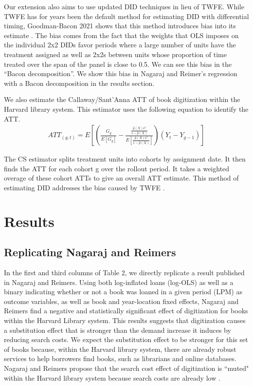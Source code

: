 \documentclass{article}
\begin{document}
Our extension also aims to use updated DID techniques in lieu of TWFE. While TWFE has for years been the default method for estimating DID with differential timing, Goodman-Bacon 2021 shows that this method introduces bias into its estimate \cite{goodman2021difference}. The bias comes from the fact that the weights that OLS imposes on the individual 2x2 DIDs favor periods where a large number of units have the treatment assigned as well as 2x2s between units whose proportion of time treated over the span of the panel is close to 0.5. We can see this bias in the ``Bacon decomposition”. We show this bias in Nagaraj and Reimer's regression with a Bacon decomposition  in the results section. 

We also estimate the Callaway/Sant'Anna ATT of book digitization within the Harvard library system. This estimator uses the following equation to identify the ATT. 
\begin{align*}
ATT_{(g,t)} = E\left[\left(\frac{G_g}{E\left[G_g\right]} - \frac{\frac{\hat{p}(X)C}{1-\hat{p}(X)}}{E\left[\frac{\hat{p}(X)C}{1-\hat{p}(X)}\right]}\right) \left(Y_t-Y_{g-1}\right)\right]
\end{align*}

The CS estimator splits treatment units into cohorts by assignment date. It then finds the ATT for each cohort g over the rollout period. It takes a weighted overage of these cohort ATTs to give an overall ATT estimate. This method of estimating DID addresses the bias caused by TWFE \cite{callaway2021difference}.


\section{Results}
\subsection{Replicating Nagaraj and Reimers}

In the first and third columns of Table 2, we directly replicate a result published in Nagaraj and Reimers. Using both log-inflated loans (log-OLS) as well as a binary indicating whether or not a book was loaned in a given period (LPM) as outcome variables, as well as book and year-location fixed effects, Nagaraj and Reimers find a negative and statistically significant effect of digitization for books within the Harvard Library system. This results suggests that digitization causes a substitution effect that is stronger than the demand increase it induces by reducing search costs. We expect the substitution effect to be stronger for this set of books because, within the Harvard library system, there are already robust services to help borrowers find books, such as librarians and online databases. Nagaraj and Reimers propose that the search cost effect of digitization is ``muted" within the Harvard library system because search costs are already low \cite{nagaraj2021digitization}. 
\end{document}
